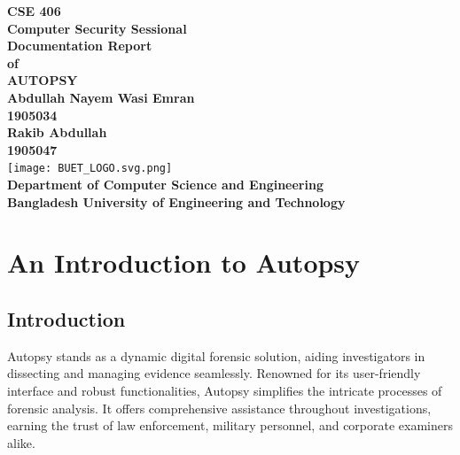 \documentclass{extarticle}
\begin{document}
\begin{titlepage}
    \centering
    \vspace*{2cm}
    {\Huge\textbf{CSE 406}}\\
    \vspace{0.5cm}
    {\Large\textbf{Computer Security Sessional}}\\
    \vspace{1.5cm}
    {\Huge\textbf{Documentation Report}}\\
    \vspace{0.2cm}
    {\Huge\textbf{of}}\\
    \vspace{0.2cm}
    {\Huge\textbf{AUTOPSY}}\\
    \vspace{1cm}
    {\Large\textbf{Abdullah Nayem Wasi Emran}}\\
    \vspace{0.2cm}
    {\large\textbf{1905034}}\\
    \vspace{0.3cm}
    {\Large\textbf{Rakib Abdullah}}\\
    \vspace{0.2cm}
    {\large\textbf{1905047}}\\
    \vspace{1cm}
    {\texttt{[image: BUET\_LOGO.svg.png]}}\\
    \vspace{1cm}
    {\Large\textbf{Department of Computer Science and Engineering}}\\
    \vspace{0.2cm}
    {\Large\textbf{Bangladesh University of Engineering and Technology}}\\
\end{titlepage}

\section{An Introduction to Autopsy}
\subsection{Introduction}
Autopsy stands as a dynamic digital forensic solution, aiding investigators in dissecting and managing evidence seamlessly. Renowned for its user-friendly interface and robust functionalities, Autopsy simplifies the intricate processes of forensic analysis. It offers comprehensive assistance throughout investigations, earning the trust of law enforcement, military personnel, and corporate examiners alike.
\end{document}
